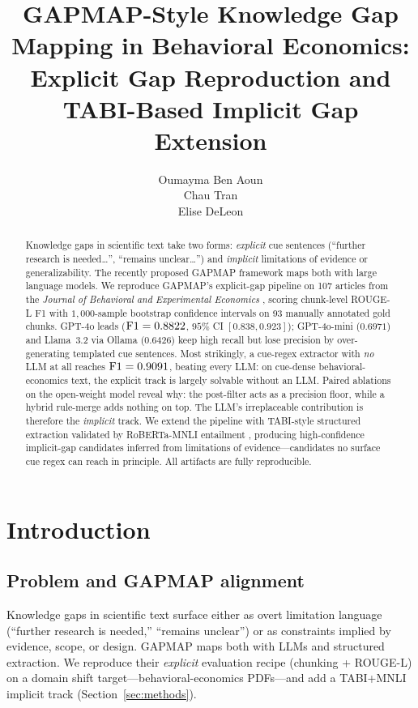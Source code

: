 \documentclass{article}
\title{GAPMAP-Style Knowledge Gap Mapping in Behavioral Economics:\\
Explicit Gap Reproduction and TABI-Based Implicit Gap Extension}
\author{Oumayma Ben Aoun \\ Chau Tran \\ Elise DeLeon}
\begin{document}
\maketitle

\begin{abstract}
Knowledge gaps in scientific text take two forms: \emph{explicit} cue sentences (``further research is needed\ldots'', ``remains unclear\ldots'') and \emph{implicit} limitations of evidence or generalizability. The recently proposed GAPMAP framework \citep{salem2025gapmap} maps both with large language models. We reproduce GAPMAP's explicit-gap pipeline on 107 articles from the \emph{Journal of Behavioral and Experimental Economics} \citep{beee2026}, scoring chunk-level ROUGE-L F1 with $1{,}000$-sample bootstrap confidence intervals on 93 manually annotated gold chunks. GPT-4o leads ($\textnormal{F1}=0.8822$, $95\%$ CI $[0.838, 0.923]$); GPT-4o-mini ($0.6971$) and Llama~3.2 via Ollama ($0.6426$) keep high recall but lose precision by over-generating templated cue sentences. Most strikingly, a cue-regex extractor with \emph{no} LLM at all reaches $\textnormal{F1}=0.9091$, beating every LLM: on cue-dense behavioral-economics text, the explicit track is largely solvable without an LLM. Paired ablations on the open-weight model reveal why: the post-filter acts as a precision floor, while a hybrid rule-merge adds nothing on top. The LLM's irreplaceable contribution is therefore the \emph{implicit} track. We extend the pipeline with TABI-style structured extraction validated by RoBERTa-MNLI entailment \citep{liu2019roberta,williams2018mnli}, producing high-confidence implicit-gap candidates inferred from limitations of evidence---candidates no surface cue regex can reach in principle. All artifacts are fully reproducible.
\end{abstract}

\section{Introduction}

\subsection{Problem and GAPMAP alignment}
Knowledge gaps in scientific text surface either as overt limitation language (``further research is needed,'' ``remains unclear'') or as constraints implied by evidence, scope, or design. GAPMAP \citep{salem2025gapmap} maps both with LLMs and structured extraction. We reproduce their \emph{explicit} evaluation recipe (chunking + ROUGE-L) on a domain shift target---behavioral-economics PDFs---and add a TABI+MNLI implicit track (Section~\ref{sec:methods}).
\end{document}
